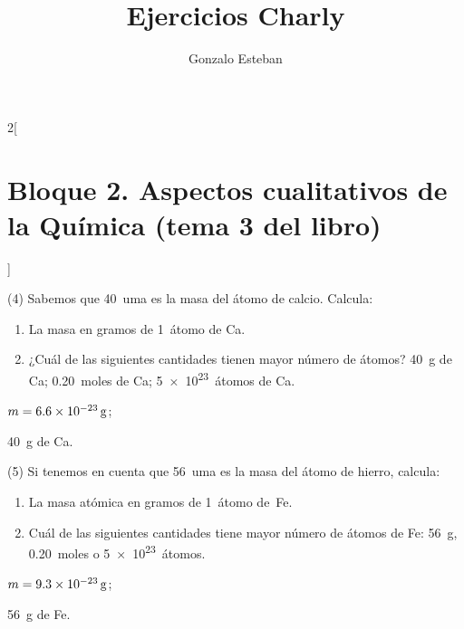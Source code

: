\documentclass[10pt]{article}
\title{Ejercicios Charly}
\author{Gonzalo Esteban}
\begin{document}
\maketitle

\begin{multicols}{2}[
    \section{Bloque 2. Aspectos cualitativos de la Química (tema 3 del libro)}
  ]

\begin{exercise}[
    tags    = {},
    topics  = {química,química básica},
    source  = {FQ 1B MGH 2016, p66, e4},
  ]
  (4) Sabemos que \SI{40}{uma} es la masa del átomo de calcio. Calcula:

  \begin{enumerate}
    \item La masa en gramos de \SI{1}{átomo} de Ca.
    \item ¿Cuál de las siguientes cantidades tienen mayor número de átomos? \SI{40}{g} de Ca; \SI{0,20}{moles} de Ca; \SI{5e23}{átomos} de Ca.
  \end{enumerate}
\end{exercise}

\begin{solution}
  \begin{enumerate*}
    \item \( m = \SI{6,6E-23}{\gram} \);
    \item \SI{40}{\gram} de Ca.
  \end{enumerate*}
\end{solution}




\begin{exercise}[
    tags    = {},
    topics  = {química,química básica},
    source  = {FQ 1B MGH 2016, p66, e5},
  ]
  (5) Si tenemos en cuenta que \SI{56}{uma} es la masa del átomo de hierro, calcula:
  \begin{enumerate}
    \item La masa atómica en gramos de \SI{1}{átomo} de~Fe.
    \item Cuál de las siguientes cantidades tiene mayor número de átomos de Fe: \SI{56}{\gram}, \SI{0,20}{moles} o \SI{5e23}{átomos}.
  \end{enumerate}
\end{exercise}

\begin{solution}
  \begin{enumerate*}
    \item \( m = \SI{9,3E-23}{\gram} \);
    \item \SI{56}{\gram} de Fe.
  \end{enumerate*}
\end{solution}





\end{multicols}
\end{document}
